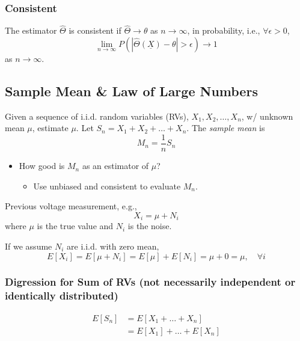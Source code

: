 \subsubsection{Consistent}
\begin{definition}
    The estimator $\hat{\Theta}$ is consistent if $\hat{\Theta} \rightarrow \theta$ as $n \to \infty$, in probability, i.e., $\forall \epsilon > 0$,
    \begin{equation}
        \lim_{n \to \infty} P(|\hat{\Theta}(\underline{X}) - \theta| > \epsilon) \rightarrow 1
    \end{equation}
    as $n \to \infty$.
\end{definition}

\subsection{Sample Mean \& Law of Large Numbers}
\begin{definition}
    Given a sequence of i.i.d. random variables (RVs), $X_1, X_2, \dots, X_n$, w/ unknown mean $\mu$, estimate $\mu$. Let $S_n = X_1 + X_2 + \dots + X_n$.  
    The \textit{sample mean} is  
    \[
    M_n = \frac{1}{n} S_n
    \]
    
    \begin{itemize}
        \item How good is $M_n$ as an estimator of $\mu$?
        \begin{itemize}
            \item Use unbiased and consistent to evaluate $M_n$.
        \end{itemize}
    \end{itemize}
\end{definition}

\begin{example}
    Previous voltage measurement, e.g.,  
    \[
    X_i = \mu + N_i
    \]
    where $\mu$ is the true value and $N_i$ is the noise.
    \vspace{1em}

    If we assume $N_i$ are i.i.d. with zero mean,  
    \[
    E[X_i] = E[\mu + N_i] = E[\mu] + E[N_i] = \mu + 0 = \mu, \quad \forall i
    \]
\end{example}

\subsubsection{Digression for Sum of RVs (not necessarily independent or identically distributed)}
\begin{derivation} 
    \begin{align*}
        E[S_n] &= E[X_1 + \dots + X_n] \\
        &= E[X_1] + \dots + E[X_n]
    \end{align*}
\end{derivation}


